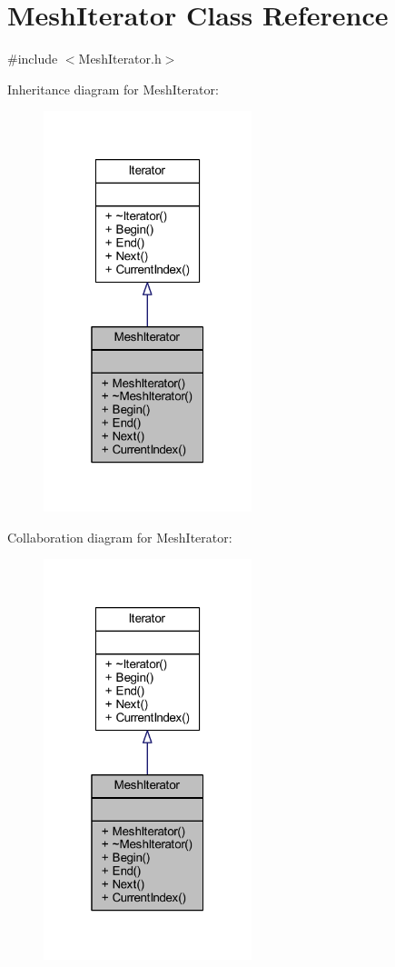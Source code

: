 \hypertarget{class_mesh_iterator}{}\section{Mesh\+Iterator Class Reference}
\label{class_mesh_iterator}


{\ttfamily \#include $<$Mesh\+Iterator.\+h$>$}



Inheritance diagram for Mesh\+Iterator\+:\nopagebreak
\begin{figure}[H]
\begin{center}
\leavevmode
\includegraphics[width=172pt]{class_mesh_iterator__inherit__graph}
\end{center}
\end{figure}


Collaboration diagram for Mesh\+Iterator\+:\nopagebreak
\begin{figure}[H]
\begin{center}
\leavevmode
\includegraphics[width=172pt]{class_mesh_iterator__coll__graph}
\end{center}
\end{figure}
